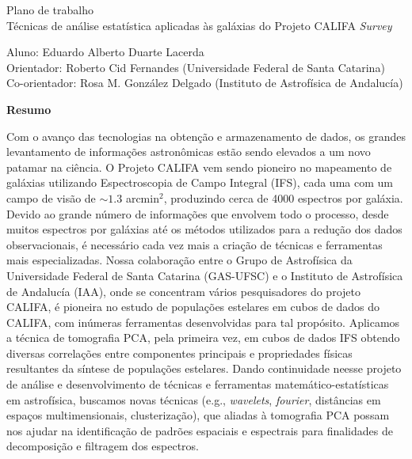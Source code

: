 \documentclass[a4paper,12pt]{article}
\begin{document}
\begin{center}
	\LARGE{Plano de trabalho}\\ \bigskip\large{Técnicas de análise estatística aplicadas às galáxias do Projeto CALIFA {\em Survey}}
\end{center}

\vspace{1cm}

\begin{flushleft}
	Aluno: Eduardo Alberto Duarte Lacerda\\
	Orientador: Roberto Cid Fernandes (Universidade Federal de Santa Catarina)\\
	Co-orientador: Rosa M. González Delgado (Instituto de Astrofísica de Andalucía)
\end{flushleft}

\begin{center}
	\textbf{Resumo}
\end{center}
Com o avanço das tecnologias na obtenção e armazenamento de dados, os grandes levantamento de informações astronômicas estão sendo elevados a um novo
patamar na ciência. O Projeto CALIFA vem sendo pioneiro no mapeamento de galáxias utilizando Espectroscopia de Campo Integral (IFS), cada uma com um
campo de visão de $\sim1.3$ arcmin${}^2$, produzindo cerca de 4000 espectros por galáxia. Devido ao grande número de informações que envolvem todo o
processo, desde muitos espectros por galáxias até os métodos utilizados para a redução dos dados observacionais, é necessário cada vez mais a criação
de técnicas e ferramentas mais especializadas. Nossa colaboração entre o Grupo de Astrofísica da Universidade Federal de Santa Catarina (GAS-UFSC) e o
Instituto de Astrofísica de Andalucía (IAA), onde se concentram vários pesquisadores do projeto CALIFA, é pioneira no estudo de populações estelares
em cubos de dados do CALIFA, com inúmeras ferramentas desenvolvidas para tal propósito. Aplicamos a técnica de tomografia PCA, pela primeira vez, em
cubos de dados IFS obtendo diversas correlações entre componentes principais e propriedades físicas resultantes da síntese de populações estelares.
Dando continuidade neesse projeto de análise e desenvolvimento de técnicas e ferramentas matemático-estatísticas em astrofísica, buscamos novas
técnicas (e.g., {\em wavelets}, {\em fourier}, distâncias em espaços multimensionais, clusterização), que aliadas à tomografia PCA possam nos ajudar
na identificação de padrões espaciais e espectrais para finalidades de decomposição e filtragem dos espectros.
	
\end{document}
